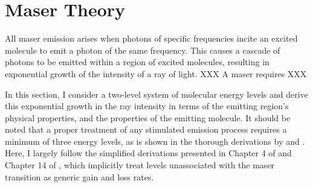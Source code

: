 \section{Maser Theory}
\label{sec:maser_theory}

All maser emission arises when photons of specific frequencies incite an excited molecule to emit a photon of the same frequency. This causes a cascade of photons to be emitted within a region of excited molecules, resulting in exponential growth of the intensity of a ray of light. XXX A maser requires XXX

In this section, I consider a two-level system of molecular energy levels and derive this exponential growth in the ray intensity in terms of the emitting region's physical properties, and the properties of the emitting molecule. It should be noted that a proper treatment of any stimulated emission process requires a minimum of three energy levels, as is shown in the thorough derivations by \cite{Elitzur_1992} and \cite{Gray_2009}. Here, I largely follow the simplified derivations presented in Chapter 4 of \citet{Elitzur_1992} and Chapter 14 of \citet{stahler_palla_2004}, which implicitly treat levels unassociated with the maser transition as generic gain and loss rates.

